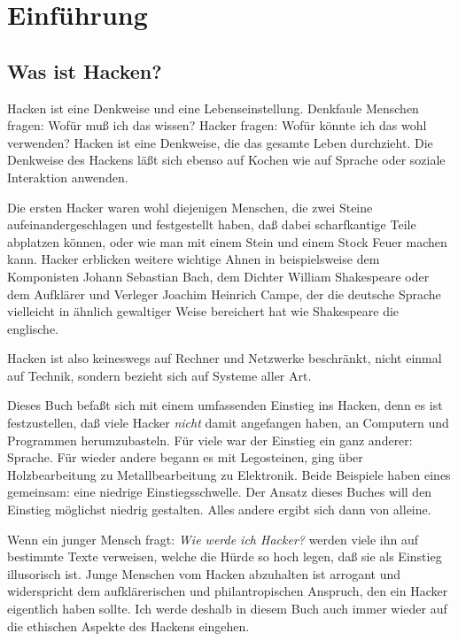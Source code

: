
\chapter{Einführung}

\section{Was ist Hacken?}

Hacken ist eine Denkweise und eine Lebenseinstellung. Denkfaule Menschen fragen: Wofür muß ich das wissen? Hacker fragen: Wofür könnte ich das wohl verwenden? Hacken ist eine Denkweise, die das gesamte Leben durchzieht. Die Denkweise des Hackens läßt sich ebenso auf Kochen wie auf Sprache oder soziale Interaktion anwenden. 

Die ersten Hacker waren wohl diejenigen Menschen, die zwei Steine aufeinandergeschlagen und festgestellt haben, daß dabei scharfkantige Teile abplatzen können, oder wie man mit einem Stein und einem Stock Feuer machen kann. Hacker erblicken weitere wichtige Ahnen in beispielsweise dem Komponisten Johann Sebastian Bach, dem Dichter William Shakespeare oder dem Aufklärer und Verleger Joachim Heinrich Campe, der die deutsche Sprache vielleicht in ähnlich gewaltiger Weise bereichert hat wie Shakespeare die englische. 

Hacken ist also keineswegs auf Rechner und Netzwerke beschränkt, nicht einmal auf Technik, sondern bezieht sich auf Systeme aller Art. 

Dieses Buch befaßt sich mit einem umfassenden Einstieg ins Hacken, denn es ist festzustellen, daß viele Hacker \emph{nicht} damit angefangen haben, an Computern und Programmen herumzubasteln. Für viele war der Einstieg ein ganz anderer: Sprache. Für wieder andere begann es mit Legosteinen, ging über Holzbearbeitung zu Metallbearbeitung zu Elektronik. Beide Beispiele haben eines gemeinsam: eine niedrige Einstiegsschwelle. Der Ansatz dieses Buches will den Einstieg möglichst niedrig gestalten. Alles andere ergibt sich dann von alleine.

Wenn ein junger Mensch fragt: \emph{Wie werde ich Hacker?} werden viele ihn auf bestimmte Texte verweisen, welche die Hürde so hoch legen, daß sie als Einstieg illusorisch ist. Junge Menschen vom Hacken abzuhalten ist arrogant und widerspricht dem aufklärerischen und philantropischen Anspruch, den ein Hacker eigentlich haben sollte. Ich werde deshalb in diesem Buch auch immer wieder auf die ethischen Aspekte des Hackens eingehen. 